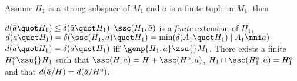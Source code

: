 \begin{prop}\label{fincharssc}
Assume $H_{1}$ is a strong subspace of $M_{1}$ and $\bar a$ is a finite tuple in $M_{1}$, then
\begin{itemize}
$d(\bar a\quot H_{1})\leq\delta(\bar a\quot H_{1})$ %
$\ssc(H_{1},\bar a)$ is a {\em finite} extension of $H_{1}$,
$d(\bar a\quot H_{1})=\delta(\ssc(H_{1},\bar a)\quot H_{1})=\min(\delta(A_{1}\quot H_{1})\mid A_{1}\nni\bar a)$
$d(\bar a\quot H_{1})=\delta(\bar a\quot H_{1})$ iff $\genp{H_{1},\bar a}\zsu{}M_{1}$.
There exists a finite $H_{1}^{\rm o}\zsu{}H_{1}$ such that $\ssc(H,\bar a)=H+\ssc(H^{\rm o},\bar a)$, 
$H_{1}\cap\ssc(H_{1}^{\rm o},\bar a)=H_{1}^{\rm o}$ and that %
$d(\bar a/ H)=d(\bar a/ H^{\rm o})$.
\end{itemize}
\end{prop}
